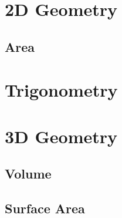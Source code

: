 \section{2D Geometry}
\subsection{Area}
\section{Trigonometry}
\section{3D Geometry}
\subsection{Volume}
\subsection{Surface Area}

